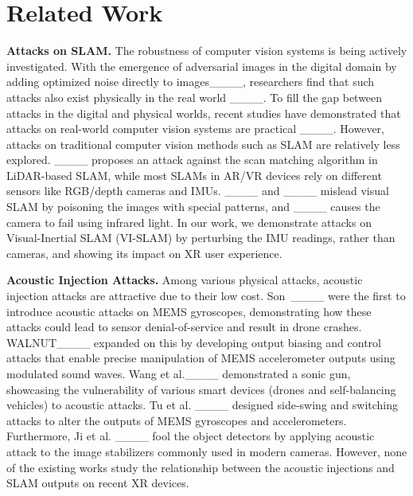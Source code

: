 \section{Related Work}
\label{sec:related}

\textbf{Attacks on SLAM.} 
The robustness of computer vision systems is being actively investigated. With the emergence of adversarial images in the digital domain by adding optimized noise directly to images____, researchers find that such attacks also exist physically in the real world ____. To fill the gap between attacks in the digital and physical worlds, recent studies have demonstrated that attacks on real-world computer vision systems are practical ____. However, attacks on traditional computer vision methods such as SLAM are relatively less explored. ____ proposes an attack against the scan matching algorithm in LiDAR-based SLAM, while most SLAMs in AR/VR devices rely on different sensors like RGB/depth cameras and IMUs. ____ and ____ mislead visual SLAM by poisoning the images with special patterns, and ____ causes the camera to fail using infrared light. In our work, we demonstrate attacks on Visual-Inertial SLAM (VI-SLAM) by perturbing the IMU readings, rather than cameras, and showing its impact on XR user experience. 

\textbf{Acoustic Injection Attacks.} Among various physical attacks, acoustic injection attacks are attractive due to their low cost. Son~\etal____ were the first to introduce acoustic attacks on MEMS gyroscopes, demonstrating how these attacks could lead to sensor denial-of-service and result in drone crashes. WALNUT____ expanded on this by developing output biasing and control attacks that enable precise manipulation of MEMS accelerometer outputs using modulated sound waves. Wang et al.____ demonstrated a sonic gun, showcasing the vulnerability of various smart devices (\eg drones and self-balancing vehicles) to acoustic attacks. Tu et al. ____ designed side-swing and switching attacks to alter the outputs of MEMS gyroscopes and accelerometers. Furthermore, Ji et al. ____ fool the object detectors by applying acoustic attack to the image stabilizers commonly used in modern cameras. However, none of the existing works study the relationship between the acoustic injections and SLAM outputs on recent XR devices. 


